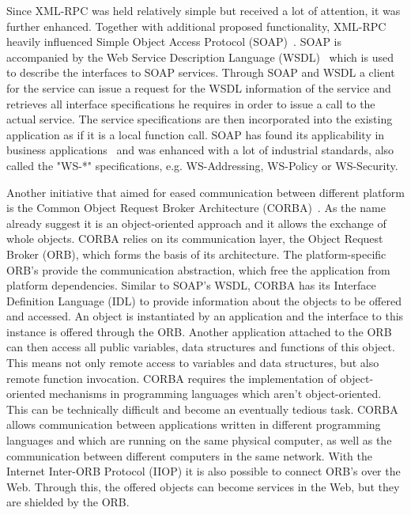 Since \textrm{XML-RPC} was held relatively simple but received a lot of attention, it was further enhanced.
Together with additional proposed functionality, XML-RPC heavily influenced Simple Object Access Protocol (\textrm{SOAP})~\cite{box2000simple}.
\textrm{SOAP} is accompanied by the Web Service Description Language (\textrm{WSDL})~\cite{christensen2001web} which is used to describe the interfaces to SOAP services.
Through \textrm{SOAP} and \textrm{WSDL} a client for the service can issue a request for the \textrm{WSDL} information of the service and retrieves all interface specifications he requires in order to issue a call to the actual service.
The service specifications are then incorporated into the existing application as if it is a local function call.
\textrm{SOAP} has found its applicability in business applications~\cite{journals/itpro/BarrosD06} and was enhanced with a lot of industrial standards, also called the "WS-*" specifications, e.g. WS-Addressing, WS-Policy or WS-Security.

Another initiative that aimed for eased communication between different platform is the Common Object Request Broker Architecture (\textrm{CORBA})~\cite{dec1991common}.
As the name already suggest it is an object-oriented approach and it allows the exchange of whole objects.
\textrm{CORBA} relies on its communication layer, the Object Request Broker (\textrm{ORB}), which forms the basis of its architecture.
The platform-specific \textrm{ORB}'s provide the communication abstraction, which free the application from platform dependencies.
Similar to \textrm{SOAP}'s \textrm{WSDL}, \textrm{CORBA} has its Interface Definition Language (\textrm{IDL}) to provide information about the objects to be offered and accessed.
An object is instantiated by an application and the interface to this instance is offered through the \textrm{ORB}.
Another application attached to the \textrm{ORB} can then access all public variables, data structures and functions of this object.
This means not only remote access to variables and data structures, but also remote function invocation.
\textrm{CORBA} requires the implementation of object-oriented mechanisms in programming languages which aren't object-oriented.
This can be technically difficult and become an eventually tedious task.
\textrm{CORBA} allows communication between applications written in different programming languages and which are running on the same physical computer, as well as the communication between different computers in the same network.
With the Internet Inter-\textrm{ORB} Protocol (\textrm{IIOP}) it is also possible to connect \textrm{ORB}'s over the Web.
Through this, the offered objects can become services in the Web, but they are shielded by the \textrm{ORB}.



